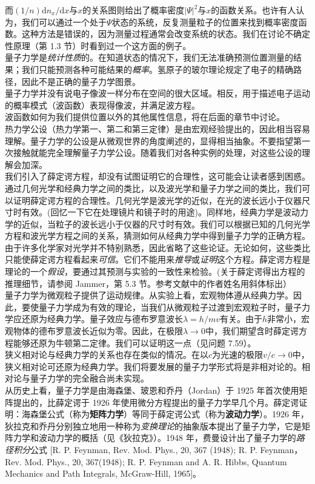 	而$\left(1/n\right) \mathrm{d}n_x / \mathrm{d}x$与$x$的关系图则给出了概率密度$\left|\Psi\right|^2$与$x$的函数关系。也许有人认为，我们可以通过一个处于$\Psi$状态的系统，反复测量粒子的位置来找到概率密度函数。这种方法是错误的，因为测量过程通常会改变系统的状态。我们在讨论不确定性原理（第 1.3 节）时看到过一个这方面的例子。\\
	\indent 量子力学是\textit{统计性质}的。在知道状态的情况下，我们无法准确预测位置测量的结果；我们只能预测各种可能结果的\textit{概率}。氢原子的玻尔理论规定了电子的精确路径，因此不是正确的量子力学图景。\\
	\indent 量子力学并没有说电子像波一样分布在空间的很大区域。相反，用于描述电子运动的概率模式（波函数）表现得像波，并满足波方程。\\
	\indent 波函数如何为我们提供位置以外的其他属性信息，将在后面的章节中讨论。\\
	\indent 热力学公设（热力学第一、第二和第三定律）是由宏观经验提出的，因此相当容易理解。量子力学的公设是从微观世界的角度阐述的，显得相当抽象。不要指望第一次接触就能完全理解量子力学公设。随着我们对各种实例的处理，对这些公设的理解会加深。\\
	\indent 我们引入了薛定谔方程，却没有试图证明它的合理性，这可能会让读者感到困惑。通过几何光学和经典力学之间的类比，以及波光学和量子力学之间的类比，我们可以证明薛定谔方程的合理性。几何光学是波光学的近似，在光的波长远小于仪器尺寸时有效。(回忆一下它在处理镜片和镜子时的用途)。同样地，经典力学是波动力学的近似，当粒子的波长远小于仪器的尺寸时有效。我们可以根据已知的几何光学方程和波光学方程之间的关系，猜测如何从经典力学中得到量子力学的正确方程。由于许多化学家对光学并不特别熟悉，因此省略了这些论证。无论如何，这些类比只能使薛定谔方程看起来\textit{可信}。它们不能用来\textit{推导}或\textit{证明}这个方程。薛定谔方程是理论的一个\textit{假设}，要通过其预测与实验的一致性来检验。(关于薛定谔得出方程的推理细节，请参阅 Jammer，第 5.3 节。参考文献中的作者姓名用斜体标出）\\
	\indent 量子力学为微观粒子提供了运动规律。从实验上看，宏观物体遵从经典力学。因此，要使量子力学成为有效的理论，当我们从微观粒子过渡到宏观粒子时，量子力学应还原为经典力学。量子效应与德布罗意波长$\lambda=h/mv$有关。由于$h$非常小，宏观物体的德布罗意波长近似为零。因此，在极限$\lambda \rightarrow 0$中，我们期望含时薛定谔方程能够还原为牛顿第二定律。我们可以证明这一点（见问题 7.59）。\\
	\indent 狭义相对论与经典力学的关系也存在类似的情况。在以$c$为光速的极限$v/c \rightarrow 0$中，狭义相对论可还原为经典力学。我们将要发展的量子力学形式将是非相对论的。相对论与量子力学的完全融合尚未实现。\\
	\indent 从历史上看，量子力学是由海森堡、玻恩和乔丹（Jordan）于 1925 年首次使用矩阵提出的，比薛定谔于 1926 年使用微分方程提出的量子力学早几个月。薛定谔证明：海森堡公式（称为\textbf{矩阵力学}）等同于薛定谔公式（称为\textbf{波动力学}）。1926 年，狄拉克和乔丹分别独立地用一种称为\textit{变换理论}的抽象版本提出了量子力学，它是矩阵力学和波动力学的概括（见《狄拉克》）。1948 年，费曼设计出了量子力学的\textit{路径积分}公式 [R. P. Feynman, Rev. Mod. Phys., 20, 367 (1948); R. P. Feynman，Rev. Mod. Phys., 20, 367(1948); R. P. Feynman and A. R. Hibbs, Quantum Mechanics and Path Integrals, McGraw-Hill, 1965]。
	
